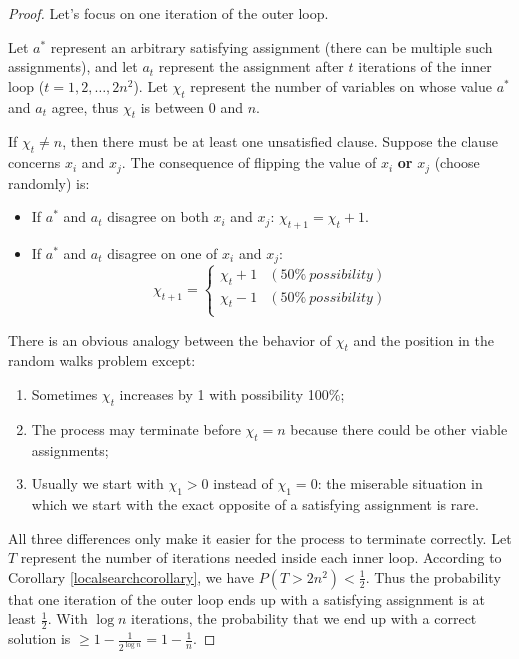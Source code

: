 \begin{proof}
Let's focus on one iteration of the outer loop. 

Let $a^*$ represent an arbitrary satisfying assignment (there can be multiple such assignments), and let $a_t$ represent the assignment after $t$ iterations of the inner loop ($t=1,2,\dots,2n^2$). Let $\chi_t$ represent the number of variables on whose value $a^*$ and $a_t$ agree, thus $\chi_t$ is between 0 and $n$. 

If $\chi_t\neq n$, then there must be at least one unsatisfied clause. Suppose the clause concerns $x_i$ and $x_j$. The consequence of flipping the value of $x_i$ \textbf{or} $x_j$ (choose randomly) is:
\begin{itemize}
\item If $a^*$ and $a_t$ disagree on both $x_i$ and $x_j$: $\chi_{t+1}=\chi_t+1$.
\item If $a^*$ and $a_t$ disagree on one of $x_i$ and $x_j$:
\begin{equation*}
\chi_{t+1}=\begin{cases}
\chi_t+1&(50\%\:possibility)\\
\chi_t-1&(50\%\:possibility)\\
\end{cases}
\end{equation*}
\end{itemize}
There is an obvious analogy between the behavior of $\chi_t$ and the position in the random walks problem except:
\begin{enumerate}
\item Sometimes $\chi_t$ increases by 1 with possibility 100\%;
\item The process may terminate before $\chi_t=n$ because there could be other viable assignments;
\item Usually we start with $\chi_1>0$ instead of $\chi_1=0$: the miserable situation in which we start with the exact opposite of a satisfying assignment is rare. 
\end{enumerate}
All three differences only make it easier for the process to terminate correctly. Let $T$ represent the number of iterations needed inside each inner loop. According to Corollary \ref{localsearchcorollary}, we have $P(T>2n^2)<\frac{1}{2}$. Thus the probability that one iteration of the outer loop ends up with a satisfying assignment is at least $\frac{1}{2}$. With $\log n$ iterations, the probability that we end up with a correct solution is $\geq 1-\frac{1}{2^{\log n}}=1-\frac{1}{n}.$


\end{proof}
\ifx\PREAMBLE\undefined

\fi